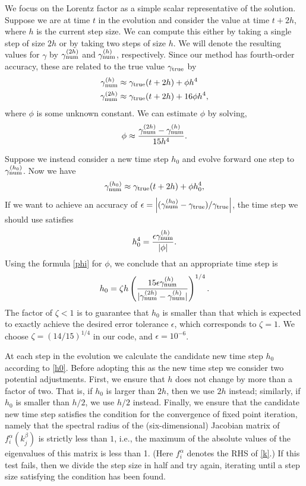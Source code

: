 \documentclass[amsmath,amssymb,nofootinbib,notitlepage,superscriptaddress,twocolumn]{revtex4-2}
\begin{document}
We focus on the Lorentz factor as a simple scalar representative of the solution. Suppose we are at time $t$ in the evolution and consider the value at time $t+2h$, where $h$ is the current step size.  We can compute this either by taking a single step of size $2h$ or by taking two steps of size $h$.  We will denote the resulting values for $\gamma$ by $\gamma_{\rm num}^{(2h)}$ and $\gamma_{\rm num}^{(h)}$, respectively.  Since our method has fourth-order accuracy, these are related to the true value $\gamma_{\rm true}$ by
\begin{align}
    \gamma_{\rm num}^{(h)} & \approx \gamma_{\rm true}(t+2h) + \phi h^4 \\
    \gamma_{\rm num}^{(2h)} & \approx \gamma_{\rm true}(t+2h) + 16 \phi h^4,
\end{align}
where $\phi$ is some unknown constant. We can estimate $\phi$ by solving,
\begin{align}\label{phi}
    \phi \approx \frac{ \gamma_{\rm num}^{(2h)}-\gamma_{\rm num}^{(h)}}{15 h^4}.
\end{align}

Suppose we instead consider a new time step $h_0$ and evolve forward one step to $\gamma^{(h_0)}_{\rm num}$. 
 Now we have 
\begin{align}
\gamma^{(h_0)}_{\rm num}\approx \gamma_{\rm true}(t+2h) + \phi h_0^4,
\end{align}
If we want to achieve an accuracy of $\epsilon = \left|(\gamma_{\rm num}^{(h_0)}-\gamma_{\rm true})/\gamma_{\rm true}\right|$, the time step we should use satisfies
\begin{align}
h_0^4 = \frac{\epsilon \gamma_{\rm num}^{(h)} }{|\phi|}.
\end{align}
Using the formula \eqref{phi} for $\phi$, we conclude that an appropriate time step is
\begin{align}\label{h0}
    h_0 = \zeta h\left(\frac{15\epsilon \gamma_{\rm num}^{(h)} }{|\gamma_{\rm num}^{(2h)}-\gamma_{\rm num}^{(h)}|}\right)^{1/4}.
\end{align}
The factor of $\zeta<1$ is to guarantee that $h_0$ is smaller than that which is expected to exactly achieve the desired error tolerance $\epsilon$, which corresponds to $\zeta=1$. We choose $\zeta=(14/15)^{1/4}$ in our code, and $\epsilon=10^{-6}$.

At each step in the evolution we calculate the candidate new time step $h_0$ according to \eqref{h0}.  Before adopting this as the new time step we consider two potential adjustments.  First, we ensure that $h$ does not change by more than a factor of two.  That is, if $h_0$ is larger than $2h$, then we use $2h$ instead; similarly, if $h_0$ is smaller than $h/2$, we use $h/2$ instead.  Finally, we ensure that the candidate new time step satisfies the condition for the convergence of fixed point iteration, namely that the spectral radius of the (six-dimensional) Jacobian matrix of $f^\alpha_i(k^\beta_j)$ is strictly less than $1$, i.e., the maximum of the absolute values of the eigenvalues of this matrix is less than 1.  (Here $f^\alpha_i$ denotes the RHS of \eqref{k}.) If this test fails, then we divide the step size in half and try again, iterating until a step size satisfying the condition has been found.
\end{document}
